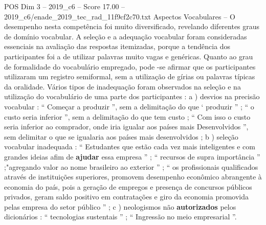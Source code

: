\begin{textsample}{POS Dim 3 – 2019\_c6 – Score 17.00 – 2019\_c6/enade\_2019\_tec\_rad\_11f9cf2c70.txt}
Aspectos Vocabulares – O desempenho nesta competência foi muito diversificado, revelando diferentes graus de domínio vocabular.
A seleção e a adequação vocabular foram consideradas essenciais na avaliação das respostas itemizadas, porque a tendência dos participantes foi a de utilizar palavras muito vagas e genéricas.
Quanto ao grau de formalidade do vocabulário empregado, pode -se afirmar que os participantes utilizaram um registro semiformal, sem a utilização de gírias ou palavras típicas da oralidade.
Vários tipos de inadequação foram observados na seleção e na utilização do vocabulário de uma parte dos participantes : a ) desvios na precisão vocabular : “ Começar a produzir ”, sem a delimitação do que ‘ produzir ” ; “ o custo seria inferior ”, sem a delimitação do que tem custo ; “ Com isso o custo seria inferior ao comprador, onde iria igualar aos países mais Desenvolvidos ”, sem delimitar o que se igualaria aos países mais desenvolvidos ; b ) seleção vocabular inadequada : “ Estudantes que estão cada vez mais inteligentes e com grandes ideias afim de \textbf{ajudar} essa empresa ” ; “ recursos de supra importância ” ;"agregando valor ao nome brasileiro ao exterior ” ; “ os profissionais qualificados através de instituições superiores, promovem desempenho econômico abrangente à economia do país, pois a geração de empregos e presença de concursos públicos privados, geram saldo positivo em contratações e giro da economia promovida pelas empresa do setor público ” ; c ) neologismos não \textbf{autorizados} pelos dicionários : “ tecnologias sustentais ” ; “ Ingressão no meio empresarial ”.

\end{textsample}
